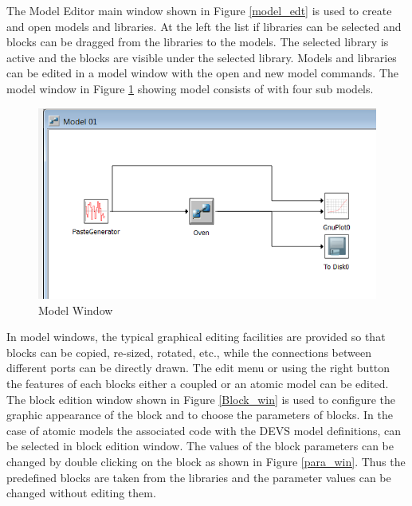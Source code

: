 \documentclass[titlepage]{report}%
\begin{document}
The Model Editor main window shown in Figure \ref{model_edt} is used to create and open models and libraries. At the left the list if libraries can be selected and blocks can be dragged from the libraries to the models. The selected library is active and the blocks are visible under the selected library. Models and libraries can be edited in a model window with the open and new model commands. The model window in Figure \ref{model_win} showing model consists of with four sub models.


 \begin{figure}[ht!]
  \centering
    \includegraphics[width=1\textwidth]{Fig3.png}
    \caption{Model Window}
    \label{model_win}
\end{figure}

In model windows, the typical graphical editing facilities are provided so that blocks can be copied, re-sized, rotated, etc., while the connections between different ports can be directly drawn. The edit menu or using the right button the features of each blocks either a coupled or an atomic model can be edited. The block edition window shown in Figure \ref{Block_win} is used to configure the graphic appearance of the block and to choose the parameters of blocks. In the case of atomic models the associated code with the DEVS model definitions, can be selected in block edition window. The values of the block parameters can be changed by double clicking on the block as shown in Figure \ref{para_win}. Thus the predefined blocks are taken from the libraries and the parameter values can be changed without editing them.
\end{document}
